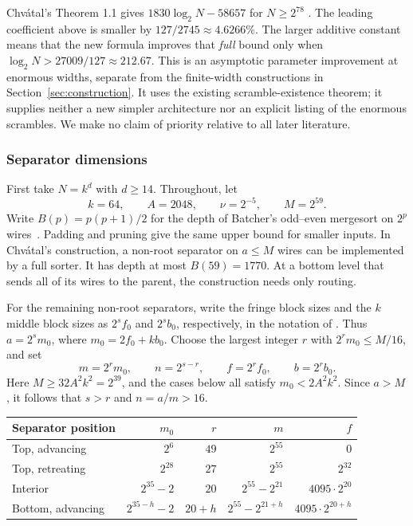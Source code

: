 \documentclass[11pt]{article}
\begin{document}
Chv\'atal's Theorem 1.1 gives $1830\log_2N-58657$ for $N\ge2^{78}$ \cite{chvatal}. The leading coefficient above is smaller by $127/2745\approx4.6266\%$. The larger additive constant means that the new formula improves that \emph{full} bound only when $\log_2N>27009/127\approx212.67$. This is an asymptotic parameter improvement at enormous widths, separate from the finite-width constructions in Section~\ref{sec:construction}. It uses the existing scramble-existence theorem; it supplies neither a new simpler architecture nor an explicit listing of the enormous scrambles. We make no claim of priority relative to all later literature.

\subsubsection{Separator dimensions}

First take \(N=k^d\) with \(d\ge14\). Throughout, let
\[
 k=64,\qquad A=2048,\qquad \nu=2^{-5},\qquad M=2^{59}.
\]
Write \(B(p)=p(p+1)/2\) for the depth of Batcher's odd--even mergesort on \(2^p\) wires~\cite{batcher}. Padding and pruning give the same upper bound for smaller inputs. In Chv\'atal's construction, a non-root separator on \(a\le M\) wires can be implemented by a full sorter. It has depth at most \(B(59)=1770\). At a bottom level that sends all of its wires to the parent, the construction needs only routing.

For the remaining non-root separators, write the fringe block sizes and the \(k\) middle block sizes as \(2^s f_0\) and \(2^s b_0\), respectively, in the notation of \cite[\S5]{chvatal}. Thus \(a=2^s m_0\), where \(m_0=2f_0+kb_0\). Choose the largest integer \(r\) with \(2^r m_0\le M/16\), and set
\[
 m=2^r m_0,\qquad n=2^{s-r},\qquad f=2^r f_0,\qquad b=2^r b_0.
\]
Here \(M\ge32A^2k^2=2^{39}\), and the cases below all satisfy \(m_0<2A^2k^2\). Since \(a>M\), it follows that \(s>r\) and \(n=a/m>16\).

\begin{center}
\small
\setlength{\tabcolsep}{9pt}
\begin{tabular}{@{}lrrrr@{}}
\toprule
Separator position & \(m_0\) & \(r\) & \(m\) & \(f\) \\
\midrule
Top, advancing & \(2^6\) & \(49\) & \(2^{55}\) & \(0\) \\
Top, retreating & \(2^{28}\) & \(27\) & \(2^{55}\) & \(2^{32}\) \\
Interior & \(2^{35}-2\) & \(20\) & \(2^{55}-2^{21}\) & \(4095\cdot2^{20}\) \\
Bottom, advancing & \(2^{35-h}-2\) & \(20+h\) & \(2^{55}-2^{21+h}\) & \(4095\cdot2^{20+h}\) \\
\bottomrule
\end{tabular}
\end{center}
\end{document}
